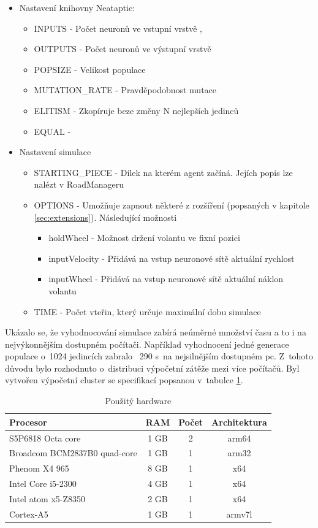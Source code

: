 \begin{itemize}
	\item Nastavení knihovny Neataptic:
	\begin{itemize}
		\item INPUTS - Počet neuronů ve vstupní vrstvě ,
		\item OUTPUTS - Počet neuronů ve výstupní vrstvě
		\item POPSIZE - Velikost populace
		\item MUTATION\_RATE - Pravděpodobnost mutace
		\item ELITISM - Zkopíruje beze změny N nejlepších jedinců
		\item EQUAL - 
	\end{itemize}
	\item Nastavení simulace
	\begin{itemize}
		\item STARTING\_PIECE - Dílek na kterém agent začíná. Jejích popis lze nalézt v RoadManageru
		\item OPTIONS - Umožňuje zapnout některé z rozšíření (popsaných v kapitole \ref{sec:extensions}). Následující možnosti
		\begin{itemize}
			\item holdWheel - Možnost držení volantu ve fixní pozici
			\item inputVelocity - Přidává na vstup neuronové sítě aktuální rychlost
			\item inputWheel - Přidává na vstup neuronové sítě aktuální náklon volantu
		\end{itemize}
		\item TIME - Počet vteřin, který určuje maximální dobu simulace
	\end{itemize}
\end{itemize}

\label{sec:cluster}
Ukázalo se, že vyhodnocování simulace zabírá neúměrné množství času a to i na nejvýkonnějším dostupném počítači. 
Například vyhodnocení jedné generace populace o~1024 jedincích zabralo ~290 s~na nejsilnějším dostupném pc. Z~tohoto důvodu bylo rozhodnuto o~distribuci výpočetní zátěže mezi více počítačů. Byl vytvořen výpočetní cluster se specifikací popsanou v~tabulce \ref{table:hw_table}.
\begin{table}[h!]
	\centering
	\begin{tabular}{|l|c|c|c|}
		\hline 
		Procesor & RAM & Počet & Architektura\\ 
		\hline 
		S5P6818 Octa core & 1 GB & 2 & arm64 \\ 
		\hline 
		Broadcom BCM2837B0 quad-core & 1 GB & 1 & arm32 \\ 
		\hline 
		Phenom X4 965 & 8 GB & 1 & x64 \\ 
		\hline
		Intel Core i5-2300 & 4 GB & 1 & x64 \\ 
		\hline 
		Intel atom x5-Z8350 & 2 GB & 1 & x64 \\ 
		\hline
		Cortex-A5 & 1 GB & 1 & armv7l \\
		\hline
	\end{tabular} 
	\caption{Použitý hardware}
	\label{table:hw_table}
	
\end{table}

